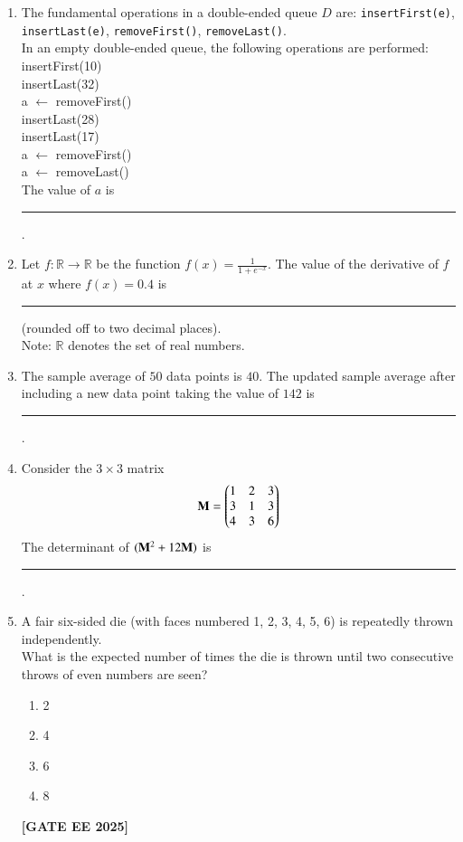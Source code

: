 \documentclass[journal]{IEEEtran}
\newcommand{\qfooter}{%
  \begin{flushright}\footnotesize\textbf{[GATE EE 2025]}\end{flushright}\vspace{1em}%
}
\begin{document}
\begin{enumerate}[leftmargin=*,label=\arabic*.]
\item The fundamental operations in a double-ended queue $D$ are: \texttt{insertFirst(e)}, \texttt{insertLast(e)}, \texttt{removeFirst()}, \texttt{removeLast()}.\\
In an empty double-ended queue, the following operations are performed: \\
insertFirst(10)\\
insertLast(32)\\
a $\leftarrow$ removeFirst()\\
insertLast(28)\\
insertLast(17)\\
a $\leftarrow$ removeFirst()\\
a $\leftarrow$ removeLast()\\
The value of $a$ is \rule{5em}{0.07em}.

\item Let $f:\mathbb{R}\to\mathbb{R}$ be the function $f(x) = \frac{1}{1+e^{-x}}$. The value of the derivative of $f$ at $x$ where $f(x) = 0.4$ is \rule{8em}{0.07em} (rounded off to two decimal places).\\
Note: $\mathbb{R}$ denotes the set of real numbers.

\item The sample average of $50$ data points is $40$. The updated sample average after including a new data point taking the value of $142$ is \rule{7em}{0.07em}.

\item Consider the $3\times 3$ matrix
\[
\mathbf{M}=
\begin{pmatrix}
1 & 2 & 3\\
3 & 1 & 3\\
4 & 3 & 6
\end{pmatrix}
\]
The determinant of $(\mathbf{M}^2 + 12\mathbf{M})$ is \rule{8em}{0.07em}.

\item A fair six-sided die (with faces numbered 1, 2, 3, 4, 5, 6) is repeatedly thrown independently.\\
What is the expected number of times the die is thrown until two consecutive throws of even numbers are seen?
\begin{multicols}{2}
\begin{enumerate}[label=(\Alph*)]
\item 2
\item 4
\item 6
\item 8
\end{enumerate} \qfooter
\end{multicols}


\end{enumerate}
\end{document}
